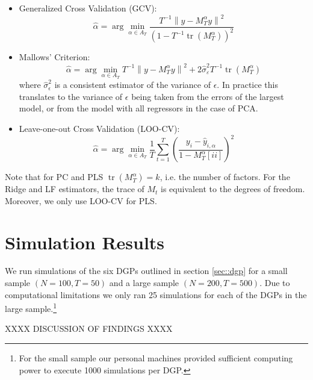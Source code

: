 \begin{itemize}
	\item Generalized Cross Validation (GCV): \\
\[\hat{\alpha}=\arg \min _{\alpha \in A_{T}} \frac{T^{-1}\left\|y-M_{T}^{\alpha} y\right\|^{2}}{\left(1-T^{-1} \operatorname{tr}\left(M_{T}^{\alpha}\right)\right)^{2}}\]

	\item Mallows' Criterion: \\
\[\hat{\alpha}=\arg \min _{\alpha \in A_{T}} T^{-1}\left\|y-M_{T}^{\alpha} y\right\|^{2}+2 \widehat{\sigma}_{\varepsilon}^{2} T^{-1} \operatorname{tr}\left(M_{T}^{\alpha}\right)\]
where $\widehat{\sigma}_{\epsilon}^{2}$ is a consistent estimator of the variance of $\epsilon$. In practice this translates to the variance of $\epsilon$ being taken from the errors of the largest model, or from the model with all regressors in the case of PCA.

	\item Leave-one-out Cross Validation (LOO-CV): \\
\[\hat{\alpha}=\arg \min _{\alpha \in A_{T}} \frac{1}{T} \sum_{t=1}^{T}\left(\frac{y_{i}-\hat{y}_{i, \alpha}}{1-M_{T}^{\alpha}[ii]}\right)^{2}\]

\end{itemize}

Note that for PC and PLS $\operatorname{tr}\left(M_{T}^{\alpha}\right) = k$, i.e. the number of factors. For the Ridge and LF estimators, the trace of $M_{t}$ is equivalent to the degrees of freedom. Moreover, we only use LOO-CV for PLS.

\section{Simulation Results}

We run simulations of the six DGPs outlined in section \ref{sec::dgp} for a small sample $(N = 100, T = 50)$ and a large sample $(N=200, T=500)$. Due to computational limitations we only ran 25 simulations for each of the DGPs in the large sample.\footnote{For the small sample our personal machines provided sufficient computing power to execute 1000 simulations per DGP.}

XXXX DISCUSSION OF FINDINGS XXXX






